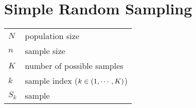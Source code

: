 \section{Simple Random Sampling \cite{statistics/book/Statistics-for-Data-Scientists/Maurits-Kaptein}}\label{Sampling Plans/Representative Sampling/Simple Random Sampling}

\begin{table}[H]
    \centering
    \begin{tabular}{l l}
        $N$ & population size \\
        $n$ & sample size \\
        $K$ & number of possible samples \\
        $k$ & sample index ($ k \in \left(1,\cdots,K\right)$) \\
        $S_k$ & sample\\
    \end{tabular}
\end{table}

